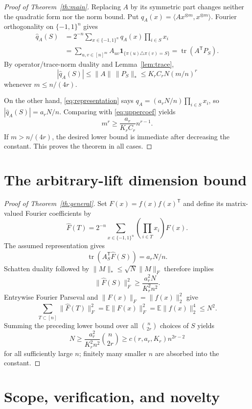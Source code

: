 \documentclass[11pt]{article}
\newcommand{\cube}{\{-1,1\}^n}
\newcommand{\E}{\mathbb E}
\newcommand{\ip}[2]{\langle #1,#2\rangle}
\newcommand{\tr}{\operatorname{tr}}
\begin{document}
\begin{proof}[Proof of Theorem~\ref{th:main}]
Replacing $A$ by its symmetric part changes neither the quadratic form nor the
norm bound.  Put
$q_A(x)=\ip{Ax^{\otimes m}}{x^{\otimes m}}$.  Fourier orthogonality on
$\cube$ gives
\begin{align*}
 \widehat q_A(S)
 &=2^{-n}\sum_{x\in\cube}q_A(x)\prod_{i\in S}x_i\\
 &=\sum_{u,v\in[n]^m}A_{uv}
   \mathbf1_{\{\pi(u)\triangle\pi(v)=S\}}
 =\tr(A^{\mathsf T}P_S).
\end{align*}
By operator/trace-norm duality and Lemma~\ref{lem:trace},
\begin{equation}
\label{eq:uppercoef}
 |\widehat q_A(S)|\leq\|A\|\,\|P_S\|_*
 \leq K_rC_rN(m/n)^r
\end{equation}
whenever $m\leq n/(4r)$.

On the other hand, \eqref{eq:representation} says
$q_A=(a_rN/n)\prod_{i\in S}x_i$, so
$|\widehat q_A(S)|=a_rN/n$.  Comparing with \eqref{eq:uppercoef} yields
\[
 m^r\geq\frac{a_r}{K_rC_r}n^{r-1}.
\]
If $m>n/(4r)$, the desired lower bound is immediate after decreasing the
constant.  This proves the theorem in all cases.
\end{proof}

\section{The arbitrary-lift dimension bound}

\begin{proof}[Proof of Theorem~\ref{th:general}]
Set $F(x)=f(x)f(x)^{\mathsf T}$ and define its matrix-valued Fourier
coefficients by
\[
 \widehat F(T)=2^{-n}\sum_{x\in\cube}
 \left(\prod_{i\in T}x_i\right)F(x).
\]
The assumed representation gives
\[
 \tr(A_S^{\mathsf T}\widehat F(S))=a_rN/n.
\]
Schatten duality followed by $\|M\|_*\leq\sqrt N\|M\|_F$ therefore implies
\[
 \|\widehat F(S)\|_F^2
 \geq\frac{a_r^2N}{K_r^2n^2}.
\]
Entrywise Fourier Parseval and $\|F(x)\|_F=\|f(x)\|_2^2$ give
\[
 \sum_{T\subset[n]}\|\widehat F(T)\|_F^2
 =\E\|F(x)\|_F^2
 =\E\|f(x)\|_2^4\leq N^2.
\]
Summing the preceding lower bound over all
$\binom n{2r}$ choices of $S$ yields
\[
 N\geq\frac{a_r^2}{K_r^2n^2}\binom n{2r}
 \geq c(r,a_r,K_r)n^{2r-2}
\]
for all sufficiently large $n$; finitely many smaller $n$ are absorbed into
the constant.
\end{proof}

\section{Scope, verification, and novelty}
\end{document}
